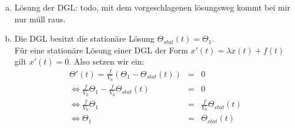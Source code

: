 \documentclass[11pt,a4paper,ngerman]{article}
\begin{document}
\begin{enumerate}[a)]
\item Lösung der  DGL: todo, mit dem vorgeschlagenen lösungsweg kommt bei mir nur müll raus.
%
%
%
%
\item Die DGL besitzt die stationäre Lösung $\Theta_{stat}(t) = \Theta_1$. \\

Für eine stationäre Lösung einer DGL der Form $x'(t) = \lambda x(t) + f(t)$ gilt $x'(t) = 0$. Also setzen wir ein:
\begin{eqnarray*}
\Theta'(t) = \frac{f}{V_0} (\Theta_1 - \Theta_{stat}(t)) &=& 0 \\
 \Leftrightarrow \frac{f}{V_0} \Theta_1 - \frac{f}{V_0} \Theta_{stat}(t) &=& 0\\
 \Leftrightarrow \frac{f}{V_0} \Theta_1 &=& \frac{f}{V_0} \Theta_{stat}(t) \\
 \Leftrightarrow \Theta_1 &=& \Theta_{stat}(t)
\end{eqnarray*}


\end{enumerate}
\end{document}
